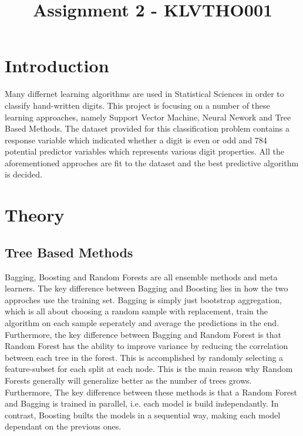 \documentclass[a4paper,10pt]{article}
\begin{document}
\setlength\parindent{0pt}


\title{Assignment 2 - KLVTHO001}
\clearpage\maketitle
\thispagestyle{empty}


\newpage
\clearpage
\setcounter{page}{1}

\section{Introduction}
Many differnet learning algorithms are used in Statistical Sciences in order
to classify hand-written digits. This project is focusing on a number of these
learning approaches, namely Support Vector Machine, Neural Nework and
Tree Based Methods. The dataset provided for this classification problem contains
a response variable which indicated whether a digit is even or odd
and 784 potential predictor variables which represents various digit properties.
All the aforementioned approches are fit to the dataset and the best
predictive algorithm is decided.

\section{Theory}
\subsection{Tree Based Methods}
Bagging, Boosting and Random Forests are all ensemble methods and meta learners. The key
difference between Bagging and Boosting lies in how the two approches use the training set. Bagging
is simply just bootstrap aggregation, which is all about choosing a random sample with replacement,
train the algorithm on each sample seperately and average the predictions in the end. Furthermore,
the key difference between Bagging and Random Forest is that Random Forest has the ability to
improve variance by reducing the correlation between each tree in the forest. This is accomplished
by randomly selecting a feature-subset for each split at each node. This is the main reason why
Random Forests generally will generalize better as the number of trees grows. Furthermore,
The key difference between these methods is that a Random Forest and Bagging is trained
in parallel, i.e. each model is build independantly. In contrast,
Boosting builts the models in a sequential way, making each model dependant on
the previous ones. \\
\end{document}
